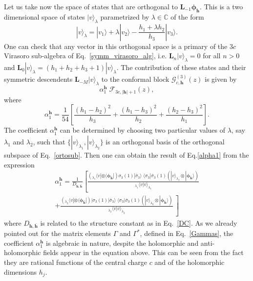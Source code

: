 \documentclass[a4paper,11pt]{article}
\begin{document}
Let us take now the space of states that are orthogonal to $\boldsymbol{L}_{-1}\boldsymbol{\phi}_{\boldsymbol{h}}$. This is a two dimensional space of states $|v\rangle_{\lambda}$ parametrized by $\lambda \in \mathbb{C}$ of the form
\begin{equation}
\label{ortosub}
 |v\rangle_{\lambda}= |v_1\rangle+\lambda |v_2\rangle
 -\frac{h_1+\lambda h_2}{h_3} |v_3\rangle.
\end{equation}
One can check
that any vector in this orthogonal space is a primary of the $3 c$ Virasoro sub-algebra of 
Eq.~\eqref{symm_virasoro_alg}, i.e. $\boldsymbol{L}_n  |v\rangle_{\lambda}=0$ for all $n>0$
and $\boldsymbol{L}_0|v\rangle_{\lambda} = (h_1+h_2+h_3+1)|v\rangle_{\lambda}$.
The contribution of these states and their symmetric descendents $\boldsymbol{L}_{-M}|v\rangle_{\lambda}$ 
to the conformal block $\mathcal{G}_{c, \boldsymbol{h}}^{(3)}(z)$ is given by
\begin{equation}
\alpha_{1}^{\boldsymbol{h}}\;\mathcal{F}_{3c, |\boldsymbol{h}|+1}(z),
\end{equation}
where 
\begin{equation}
\label{alpha1}
\alpha_{1}^{\boldsymbol{h}} =\frac{1}{54}\left[\frac{(h_1-h_2)^2}{h_3}+\frac{(h_1-h_3)^2}{h_2}+\frac{(h_2-h_3)^2}{h_1}\right].
\end{equation}
The coefficient $\alpha_{1}^{\boldsymbol{h}}$ can  be determined by choosing two particular values of $\lambda$, say $\lambda_1$ and $\lambda_2$, such that $\{|v\rangle_{\lambda_1}, |v\rangle_{\lambda_2}\}$ is an orthogonal basis of the orthogonal subspace of Eq.~\eqref{ortosub}. Then one can obtain the result of Eq.\eqref{alpha1} from the expression
\begin{multline}
 \alpha_1^{\boldsymbol{h}}=\frac{1}{D_{\boldsymbol{h},\boldsymbol{\bar{h}}}}
 \left[\frac{(_{\lambda_1}\langle v |\otimes \langle \boldsymbol{\phi}_{\boldsymbol{\bar{h}}}|)\sigma_{3}(1)|\bar{\sigma}_3\rangle \;\langle \sigma_{3}|\bar{\sigma}_3(1) (|v\rangle_{\lambda_1}\otimes |\boldsymbol{\phi}_{\boldsymbol{\bar{h}}}\rangle)}{_{\lambda_1}\langle v|v\rangle_{\lambda_1}}  \right.\\ 
 +\left.
 \frac{( _{\lambda_2}\langle v| \otimes \langle \boldsymbol{\phi}_{\boldsymbol{\bar{h}}}|)|\sigma_{3}(1)|\bar{\sigma}_3\rangle \;\langle \sigma_{3}|\bar{\sigma}_3(1)(|v\rangle_{\lambda_2}\otimes |\boldsymbol{\phi}_{\boldsymbol{\bar{h}}}\rangle)}{_{\lambda_2}\langle v|v\rangle_{\lambda_2}}\  \right]
\end{multline}
where $D_{\boldsymbol{h},\boldsymbol{\bar{h}}}$ is related to the structure constant as in Eq.~\eqref{DC}. As we already pointed out for the matrix elements $\Gamma$ and $\Gamma^*$, defined in Eq.~\eqref{Gammas}, the coefficient $\alpha^{\boldsymbol{h}}_1$  is algebraic in nature, despite the holomorphic and anti-holomorphic fields appear in the equation above. This can be seen from the fact they are rational functions of the central charge $c$ and of the holomorphic dimensions $h_j$.
\end{document}
